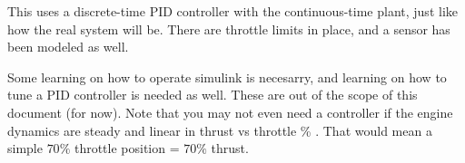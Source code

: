 \documentclass{article}
\begin{document}
This uses a discrete-time PID controller with the continuous-time plant, just like how the real system will be. There are throttle limits in place, and a sensor has been modeled as well.

Some learning on how to operate simulink is necesarry, and learning on how to tune a PID controller is needed as well. These are out of the scope of this document (for now). Note that you may not even need a controller if the engine dynamics are steady and linear in thrust vs throttle \% . That would mean a simple $70\%$ throttle position = $70\%$ thrust.
\end{document}
